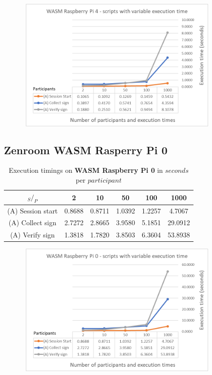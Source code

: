 \documentclass[twocolumn]{article}
\begin{document}
\begin{figure}[h!]
    \centering
    \includegraphics[width=4in, height=2.6in]{graphs/WasmRaspi4.png}
    \label{fig:galaxy}
\end{figure}

\subsection*{Zenroom WASM Rasperry Pi 0}

\begin{table}[h!]
  \begin{center}
    \caption{Execution timings on \textbf{WASM Raspberry Pi 0} in $seconds$ per $participant$}
      \label{tab:table1}
        \begin{tabular} {c|c|c|c|c|c}
          \toprule
           \textbf{$_S / _P$} & \textbf{2} & \textbf{10} & \textbf{50} & \textbf{100} & \textbf{1000} \\
          \midrule
          (A) Session start & 0.8688 & 0.8711 & 1.0392 & 1.2257 & 4.7067 \\
          (A) Collect sign & 2.7272 & 2.8665 & 3.9580 & 5.1851 & 29.0912 \\
          (A) Verify sign & 1.3818 & 1.7820 & 3.8503 & 6.3604 & 53.8938 \\
      \bottomrule %
    \end{tabular}
  \end{center}
\end{table}

\begin{figure}[h!]
    \centering
    \includegraphics[width=4in, height=2.6in]{graphs/WasmRaspi0.png}
    \label{fig:galaxy}
\end{figure}
\end{document}
